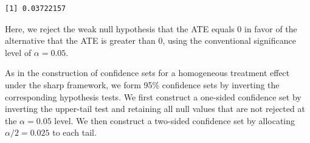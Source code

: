 \documentclass[
  12pt,
  leqno]{article}
\newenvironment{Shaded}{\begin{snugshade}}{\end{snugshade}}
\newcommand{\AttributeTok}[1]{\textcolor[rgb]{0.13,0.29,0.53}{#1}}
\newcommand{\CommentTok}[1]{\textcolor[rgb]{0.56,0.35,0.01}{\textit{#1}}}
\newcommand{\ConstantTok}[1]{\textcolor[rgb]{0.56,0.35,0.01}{#1}}
\newcommand{\DecValTok}[1]{\textcolor[rgb]{0.00,0.00,0.81}{#1}}
\newcommand{\FunctionTok}[1]{\textcolor[rgb]{0.13,0.29,0.53}{\textbf{#1}}}
\newcommand{\NormalTok}[1]{#1}
\newcommand{\OtherTok}[1]{\textcolor[rgb]{0.56,0.35,0.01}{#1}}
\newcommand{\SpecialCharTok}[1]{\textcolor[rgb]{0.81,0.36,0.00}{\textbf{#1}}}
\begin{document}
\singlespacing

\begin{Shaded}
\end{Shaded}

\begin{verbatim}
[1] 0.03722157
\end{verbatim}

\doublespacing

Here, we reject the weak null hypothesis that the ATE equals \(0\) in
favor of the alternative that the ATE is greater than \(0\), using the
conventional significance level of \(\alpha = 0.05\).

As in the construction of confidence sets for a homogeneous treatment
effect under the sharp framework, we form 95\% confidence sets by
inverting the corresponding hypothesis tests. We first construct a
one-sided confidence set by inverting the upper-tail test and retaining
all null values that are not rejected at the \(\alpha = 0.05\) level. We
then construct a two-sided confidence set by allocating
\(\alpha/2 = 0.025\) to each tail.

\singlespacing

\begin{Shaded}
\end{Shaded}
\end{document}
